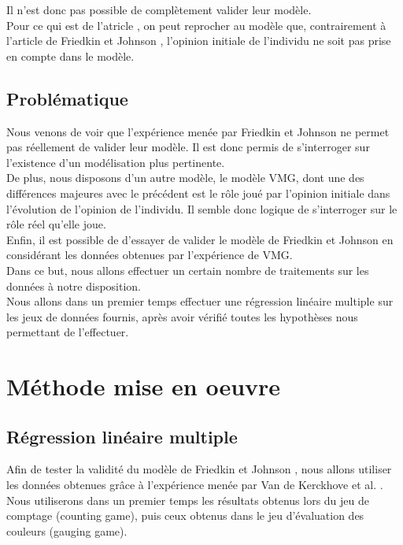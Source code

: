 \documentclass{scrreprt}
\begin{document}
\begin{multicols}{2}
Il n'est donc pas possible de complètement valider leur modèle.\\

Pour ce qui est de l'atricle \cite{VMG}, on peut reprocher au modèle que, contrairement à l'article de Friedkin et Johnson \cite{FJ}, l'opinion initiale de l'individu ne soit pas prise en compte dans le modèle.

\section{Problématique}

Nous venons de voir que l’expérience menée par Friedkin et Johnson ne permet pas réellement de valider leur modèle. Il est donc permis de s'interroger sur l'existence d'un modélisation plus pertinente.\\

De plus, nous disposons d’un autre modèle, le modèle VMG, dont une des différences majeures avec le précédent est le rôle joué par l’opinion initiale dans l'évolution de l'opinion de l'individu. Il semble donc logique de s’interroger sur le rôle réel qu’elle joue.\\

Enfin, il est possible de d’essayer de valider le modèle de Friedkin et Johnson en considérant les données obtenues par l’expérience de VMG.\\%

Dans ce but, nous allons effectuer un certain nombre de traitements sur les données à notre disposition. \\

Nous allons dans un premier temps effectuer une régression linéaire multiple sur les jeux de données fournis, après avoir vérifié toutes les hypothèses nous permettant de l'effectuer. \\

\chapter{Méthode mise en oeuvre}

\section{Régression linéaire multiple}

Afin de tester la validité du modèle de Friedkin et Johnson \cite{FJ}, nous allons utiliser les données obtenues grâce à l’expérience menée par Van de Kerckhove et al. \cite{VMG}. Nous utiliserons dans un premier temps les résultats obtenus lors du jeu de comptage (counting game), puis ceux obtenus dans le jeu d’évaluation des couleurs (gauging game).\\


\end{multicols}
\end{document}
